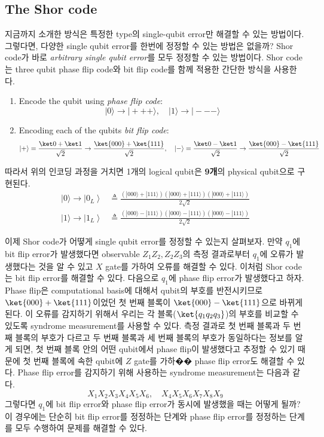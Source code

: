 \subsection{The Shor code}
지금까지 소개한 방식은 특정한 type의 single-qubit error만 해결할 수 있는 방법이다. 그렇다면, 다양한 single qubit error를 한번에 정정할 수 있는 방법은 없을까? Shor code가 바로 \textit{arbitrary single qubit error}를 모두 정정할 수 있는 방법이다. Shor code는 three qubit phase flip code와 bit flip code를 함께 적용한 간단한 방식을 사용한다.
\begin{enumerate}
    \item Encode the qubit using \textit{phase flip code}:
    \begin{equation*}
        |0\rangle \rightarrow|+++\rangle, \quad|1\rangle \rightarrow|---\rangle
    \end{equation*}
    \item Encoding each of the qubits \textit{bit flip code}:
    \begin{equation*}
        |+ \rangle = \frac{\ket 0 + \ket 1}{\sqrt 2} \rightarrow \frac{\ket{000} + \ket{111}}{\sqrt 2}, \quad |-\rangle = \frac{\ket 0 - \ket 1}{\sqrt 2} \rightarrow \frac{\ket{000} - \ket{111}}{\sqrt 2}
    \end{equation*}
\end{enumerate}
따라서 위의 인코딩 과정을 거치면 1개의 logical qubit은 \textbf{9개}의 physical qubit으로 구현된다. 
\begin{align*}
    |0\rangle \rightarrow\left|0_L\right\rangle & \triangleq \frac{(|000\rangle+|111\rangle)(|000\rangle+|111\rangle)(|000\rangle+|111\rangle)}{2 \sqrt{2}} \\
    |1\rangle \rightarrow\left|1_L\right\rangle & \triangleq \frac{(|000\rangle-|111\rangle)(|000\rangle-|111\rangle)(|000\rangle-|111\rangle)}{2 \sqrt{2}}
\end{align*}

이제 Shor code가 어뗳게 single qubit error를 정정할 수 있는지 살펴보자. 만약 $q_1$에 bit flip error가 발생했다면 observable $Z_1Z_2, Z_2Z_3$의 측정 결과로부터 $q_1$에 오류가 발생했다는 것을 알 수 있고 $X$ gate를 가하여 오류를 해결할 수 있다. 이처럼 Shor code는 bit flip error를 해결할 수 있다.
다음으로 $q_1$에 phase flip error가 발생했다고 하자. Phase flip은 computational basis에 대해서 qubit의 부호를 반전시키므로 $\ket{000} + \ket{111}$이었던 첫 번째 블록이 $\ket{000} - \ket{111}$으로 바뀌게 된다. 이 오류를 감지하기 위해서 우리는 각 블록($\ket{q_1q_2q_3}$)의 부호를 비교할 수 있도록 syndrome measurement를 사용할 수 있다. 
측정 결과로 첫 번째 블록과 두 번째 블록의 부호가 다르고 두 번째 블록과 세 번째 블록의 부호가 동일하다는 정보를 알게 되면, 첫 번째 블록 안의 어떤 qubit에서 phase flip이 발생했다고 추정할 수 있기 때문에 첫 번째 블록에 속한 qubit에 $Z$ gate를 가하�� phase flip error도 해결할 수 있다. Phase flip error를 감지하기 위해 사용하는 syndrome measurement는 다음과 같다.
\begin{equation*}
    X_1X_2X_3X_4X_5X_6, \quad X_4X_5X_6X_7X_8X_9
\end{equation*}
그렇다면 $q_1$에 bit flip error와 phase flip error가 동시에 발생했을 때는 어떻게 될까? 이 경우에는 단순히 bit flip error를 정정하는 단계와 phase flip error를 정정하는 단계를 모두 수행하여 문제를 해결할 수 있다.

